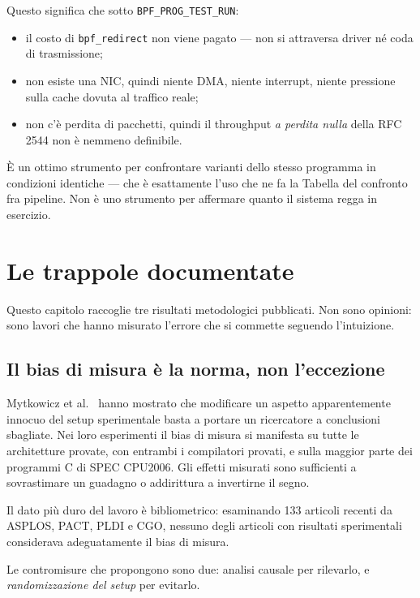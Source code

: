 \documentclass[11pt,a4paper,oneside]{report}
\begin{document}
Questo significa che sotto \texttt{BPF\_PROG\_TEST\_RUN}:

\begin{itemize}
  \item il costo di \texttt{bpf\_redirect} non viene pagato --- non si
  attraversa driver né coda di trasmissione;
  \item non esiste una NIC, quindi niente DMA, niente interrupt,
  niente pressione sulla cache dovuta al traffico reale;
  \item non c'è perdita di pacchetti, quindi il throughput
  \emph{a perdita nulla} della RFC 2544 non è nemmeno definibile.
\end{itemize}

È un ottimo strumento per confrontare varianti dello stesso programma
in condizioni identiche --- che è esattamente l'uso che ne fa la
Tabella del confronto fra pipeline. Non è uno strumento per affermare
quanto il sistema regga in esercizio.

\chapter{Le trappole documentate}
\label{ch:trappole}

Questo capitolo raccoglie tre risultati metodologici pubblicati. Non
sono opinioni: sono lavori che hanno misurato l'errore che si commette
seguendo l'intuizione.

\section{Il bias di misura è la norma, non l'eccezione}

Mytkowicz et al.~\cite{mytkowicz09} hanno mostrato che modificare un
aspetto apparentemente innocuo del setup sperimentale basta a portare
un ricercatore a conclusioni sbagliate. Nei loro esperimenti il bias
di misura si manifesta su tutte le architetture provate, con entrambi
i compilatori provati, e sulla maggior parte dei programmi C di SPEC
CPU2006. Gli effetti misurati sono sufficienti a sovrastimare un
guadagno o addirittura a invertirne il segno.

Il dato più duro del lavoro è bibliometrico: esaminando 133 articoli
recenti da ASPLOS, PACT, PLDI e CGO, nessuno degli articoli con
risultati sperimentali considerava adeguatamente il bias di misura.

Le contromisure che propongono sono due: analisi causale per rilevarlo,
e \emph{randomizzazione del setup} per evitarlo.
\end{document}

